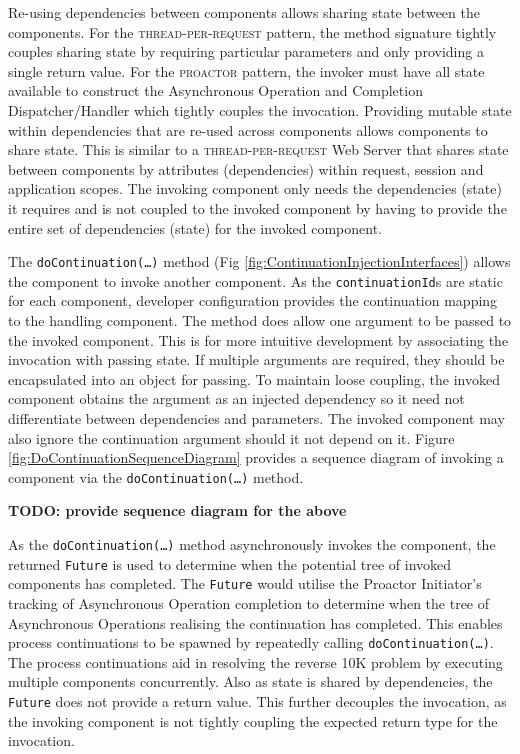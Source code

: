\documentclass[prodmode]{style/acmlarge}
\begin{document}
Re-using dependencies between components allows sharing state between the
components.  For the \textsc{thread-per-request} pattern, the method signature
tightly couples sharing state by requiring particular parameters and only
providing a single return value.  For the \textsc{proactor} pattern, the invoker
must have all state available to construct the Asynchronous Operation and
Completion Dispatcher/Handler which tightly couples the invocation.  Providing
mutable state within dependencies that are re-used across components allows
components to share state.  This is similar to a \textsc{thread-per-request} Web
Server that shares state between components by attributes (dependencies) within
request, session and application scopes.  The invoking component only needs the
dependencies (state) it requires and is not coupled to the invoked component by
having to provide the entire set of dependencies (state) for the invoked
component.

The \texttt{doContinuation(\ldots)} method (Fig
\ref{fig:ContinuationInjectionInterfaces}) allows the component to invoke
another component.  As the \texttt{continuationId}s are static for each
component, developer configuration provides the continuation mapping to the
handling component.  The method does allow one argument to be passed to the
invoked component.  This is for more intuitive development by associating the
invocation with passing state.  If multiple arguments are required, they should
be encapsulated into an object for passing.  To maintain loose coupling, the
invoked component obtains the argument as an injected dependency so it need not
differentiate between dependencies and parameters.  The invoked component may
also ignore the continuation argument should it not depend on it.  Figure
\ref{fig:DoContinuationSequenceDiagram} provides a sequence diagram of invoking
a component via the \texttt{doContinuation(\ldots)} method.

\textbf{TODO: provide sequence diagram for the above}

As the \texttt{doContinuation(\ldots)} method asynchronously invokes the
component, the returned \texttt{Future} is used to determine when the potential
tree of invoked components has completed.  The \texttt{Future} would utilise the
Proactor Initiator's tracking of Asynchronous Operation completion to determine
when the tree of Asynchronous Operations realising the continuation has
completed.  This enables process continuations \cite{process-continuation} to be
spawned by repeatedly calling \texttt{doContinuation(\ldots)}.  The process
continuations aid in resolving the reverse 10K problem
\cite{reverse-ten-k-problem} by executing multiple components concurrently.
Also as state is shared by dependencies, the \texttt{Future} does not provide a
return value.  This further decouples the invocation, as the invoking component
is not tightly coupling the expected return type for the invocation.
\end{document}
